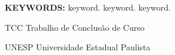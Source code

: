\documentclass[
  12pt,		%
  a4paper,	%
  openright,%
  oneside,	%
  chapter=TITLE,		%
  section=TITLE,		%
  english,	%
  french,	%
  spanish,	%
  brazil
]{abntex2}
\begin{document}
    \begin{resumo}[Abstract] %
    
        \lipsum[1] %
        
        \vspace*{0.5cm}
        
        \noindent\textbf{\MakeUppercase{Keywords: }} keyword. keyword. keyword.
    
    \end{resumo}
    
    
    \listoffigures*
    \newpage
    
    
    \listoftables*
    \newpage
    
    
    \begin{siglas}
        \item[TCC] Trabalho de Conclusão de Curso
        \item[UNESP] Universidade Estadual Paulista
    \end{siglas}
    
\end{document}
